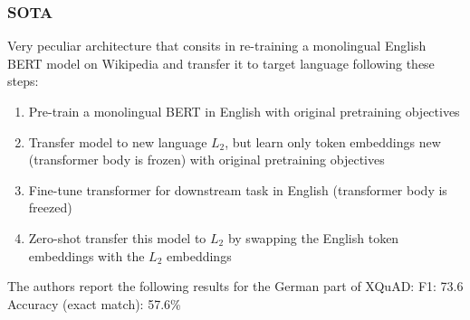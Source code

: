 


\subsubsection{SOTA}

Very peculiar architecture that consits in re-training a monolingual English BERT model on
Wikipedia and transfer it to target language following these steps:

\begin{enumerate}
    \item Pre-train a monolingual BERT in English with original pretraining objectives
    \item Transfer model to new language $L_2$, but learn only token embeddings new (transformer body is frozen) with original pretraining objectives
    \item Fine-tune transformer for downstream task in English (transformer body is freezed)
    \item Zero-shot transfer this model to $L_2$ by swapping the English token embeddings with the $L_2$ embeddings
\end{enumerate}

The authors report the following results for the German part of XQuAD:
F1: 73.6
Accuracy (exact match): 57.6\%

